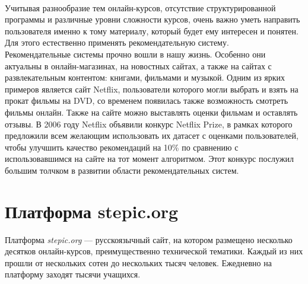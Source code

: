 \documentclass[14pt]{matmex-diploma}
\begin{document}
\\\indent Учитывая разнообразие тем онлайн-курсов, отсутствие структурированной программы и различные уровни сложности курсов, очень важно уметь направить пользователя именно к тому материалу, который будет ему интересен и понятен. Для этого естественно применять рекомендательную систему.
\\\indent Рекомендательные системы прочно вошли в нашу жизнь. Особенно они актуальны в онлайн-магазинах, на новостных сайтах, а также на сайтах с развлекательным контентом: книгами, фильмами и музыкой. Одним из ярких примеров является сайт Netflix\cite{netflix}, пользователи которого могли выбрать и взять на прокат фильмы на DVD, со временем появилась также возможность смотреть фильмы онлайн. Также на сайте можно выставлять оценки фильмам и оставлять отзывы. В 2006 году Netflix объявили конкурс Netflix Prize\cite{netflix_prize}, в рамках которого предложили всем желающим использовать их датасет с оценками пользователей, чтобы улучшить качество рекомендаций на 10\% по сравнению с использовавшимся на сайте на тот момент алгоритмом. Этот конкурс послужил большим толчком в развитии области рекомендательных систем.


\section{Платформа stepic.org}
\indent Платформа \textit{stepic.org}\cite{stepic} --- русскоязычный сайт, на котором размещено несколько десятков онлайн-курсов, преимущественно технической тематики. Каждый из них прошли от нескольких сотен до нескольких тысяч человек. Ежедневно на платформу заходят тысячи учащихся.
\end{document}
